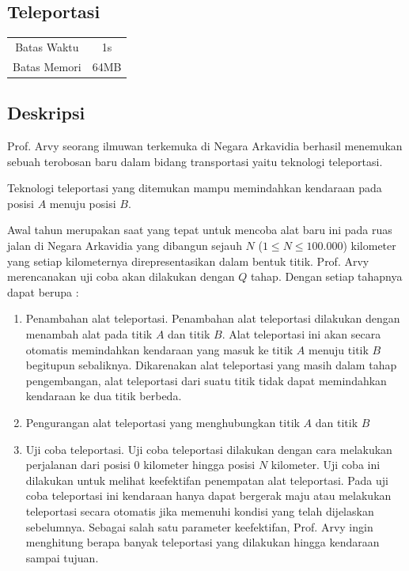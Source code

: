 \documentclass{article}
\begin{document}
\begin{center}
    \section*{Teleportasi} %

    \begin{tabular}{ | c c | }
        \hline
        Batas Waktu  & 1s \\    %
        Batas Memori & 64MB \\  %
        \hline
    \end{tabular}
\end{center}

\subsection*{Deskripsi}

Prof. Arvy seorang ilmuwan terkemuka di Negara Arkavidia berhasil menemukan sebuah terobosan baru dalam bidang transportasi yaitu teknologi teleportasi.

Teknologi teleportasi yang ditemukan mampu memindahkan kendaraan pada posisi $A$ menuju posisi $B$.

Awal tahun merupakan saat yang tepat untuk mencoba alat baru ini pada ruas jalan di Negara Arkavidia yang dibangun sejauh $N$ ($1 \leq N \leq 100.000$) kilometer yang setiap kilometernya direpresentasikan dalam bentuk titik. Prof. Arvy merencanakan uji coba akan dilakukan dengan $Q$ tahap. Dengan setiap tahapnya dapat berupa :

\begin{enumerate}
    \setlength\itemsep{0pt}
    \item  Penambahan alat teleportasi. Penambahan alat teleportasi dilakukan dengan menambah alat pada titik $A$ dan titik $B$. Alat teleportasi ini akan secara otomatis memindahkan kendaraan yang masuk ke titik $A$ menuju titik $B$ begitupun sebaliknya. Dikarenakan alat teleportasi yang masih dalam tahap pengembangan, alat teleportasi dari suatu titik tidak dapat memindahkan kendaraan ke dua titik berbeda.

    \item Pengurangan alat teleportasi yang menghubungkan titik $A$ dan titik $B$

    \item Uji coba teleportasi. Uji coba teleportasi dilakukan dengan cara melakukan perjalanan dari posisi $0$ kilometer hingga posisi $N$ kilometer. Uji coba ini dilakukan untuk melihat keefektifan penempatan alat teleportasi. Pada uji coba teleportasi ini kendaraan hanya dapat bergerak maju atau melakukan teleportasi secara otomatis jika memenuhi kondisi yang telah dijelaskan sebelumnya. Sebagai salah satu parameter keefektifan, Prof. Arvy ingin menghitung berapa banyak teleportasi yang dilakukan hingga kendaraan sampai tujuan.   
\end{enumerate}
\end{document}
